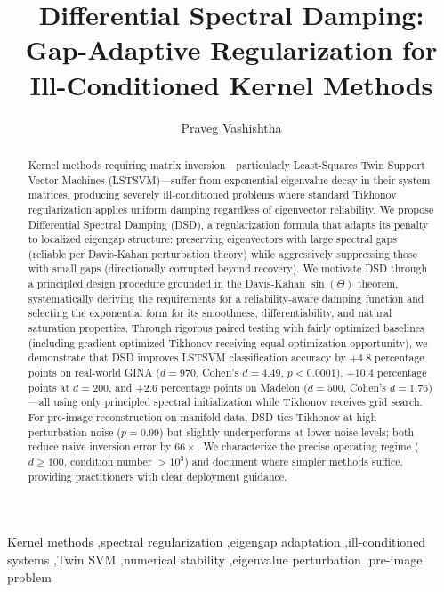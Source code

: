 \documentclass[preprint,review,12pt]{elsarticle}
\begin{document}
\begin{frontmatter}

\title{Differential Spectral Damping: Gap-Adaptive Regularization for Ill-Conditioned Kernel Methods}

\author[iitpatna,sbs]{Praveg Vashishtha}


\begin{abstract}
Kernel methods requiring matrix inversion---particularly Least-Squares Twin Support Vector Machines (LSTSVM)---suffer from exponential eigenvalue decay in their system matrices, producing severely ill-conditioned problems where standard Tikhonov regularization applies uniform damping regardless of eigenvector reliability. We propose Differential Spectral Damping (DSD), a regularization formula that adapts its penalty to localized eigengap structure: preserving eigenvectors with large spectral gaps (reliable per Davis-Kahan perturbation theory) while aggressively suppressing those with small gaps (directionally corrupted beyond recovery). We motivate DSD through a principled design procedure grounded in the Davis-Kahan $\sin(\Theta)$ theorem, systematically deriving the requirements for a reliability-aware damping function and selecting the exponential form for its smoothness, differentiability, and natural saturation properties. Through rigorous paired testing with fairly optimized baselines (including gradient-optimized Tikhonov receiving equal optimization opportunity), we demonstrate that DSD improves LSTSVM classification accuracy by $+4.8$ percentage points on real-world GINA ($d{=}970$, Cohen's $d = 4.49$, $p < 0.0001$), $+10.4$ percentage points at $d{=}200$, and $+2.6$ percentage points on Madelon ($d{=}500$, Cohen's $d = 1.76$)---all using only principled spectral initialization while Tikhonov receives grid search. For pre-image reconstruction on manifold data, DSD ties Tikhonov at high perturbation noise ($p{=}0.99$) but slightly underperforms at lower noise levels; both reduce naive inversion error by $66\times$. We characterize the precise operating regime ($d \geq 100$, condition number $> 10^3$) and document where simpler methods suffice, providing practitioners with clear deployment guidance.
\end{abstract}

\begin{keyword}
Kernel methods \sep spectral regularization \sep eigengap adaptation \sep ill-conditioned systems \sep Twin SVM \sep numerical stability \sep eigenvalue perturbation \sep pre-image problem
\end{keyword}

\end{frontmatter}
\end{document}
